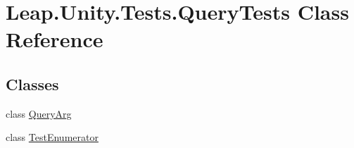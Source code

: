 \hypertarget{class_leap_1_1_unity_1_1_tests_1_1_query_tests}{}\section{Leap.\+Unity.\+Tests.\+Query\+Tests Class Reference}
\label{class_leap_1_1_unity_1_1_tests_1_1_query_tests}
\subsection*{Classes}
\begin{DoxyCompactItemize}
\item 
class \mbox{\hyperlink{class_leap_1_1_unity_1_1_tests_1_1_query_tests_1_1_query_arg}{Query\+Arg}}
\item 
class \mbox{\hyperlink{class_leap_1_1_unity_1_1_tests_1_1_query_tests_1_1_test_enumerator}{Test\+Enumerator}}
\end{DoxyCompactItemize}
